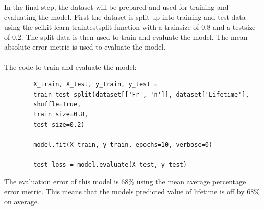 \documentclass[letterpaper,10pt]{article}
\begin{document}
	In the final step, the dataset will be prepared and used for training and evaluating the model. First the dataset is split up into training and test data using the scikit-learn train\textunderscore test\textunderscore split function with a train\textunderscore size of 0.8 and a test\textunderscore size of 0.2. The split data is then used to train and evaluate the model. The mean absolute error metric is used to evaluate the model.
	\\ \\ The code to train and evaluate the model:
	\begin{lstlisting}
		X_train, X_test, y_train, y_test = 
		train_test_split(dataset[['Fr', 'n']], dataset['Lifetime'], 
		shuffle=True, 
		train_size=0.8, 
		test_size=0.2)
		
		model.fit(X_train, y_train, epochs=10, verbose=0)
		
		test_loss = model.evaluate(X_test, y_test)
	\end{lstlisting} 
	The evaluation error of this model is 68\% using the mean average percentage error metric. This means that the models predicted value of lifetime is off by 68\% on average.
	
	
	
	
	
	
	
	
	
	
	
	
	
	
	
	
	
	
	
	
	
	
	
	
	
	
	
	
	
	
	
	
	
\end{document}
